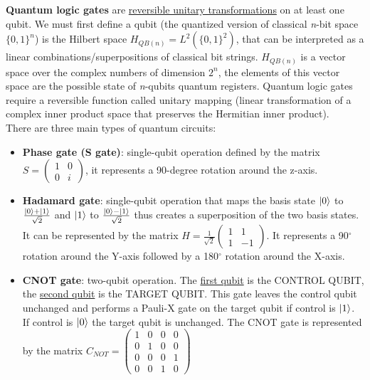 \textbf{Quantum logic gates} are \underline{reversible unitary transformations} on at least one qubit. We must first define a qubit (the quantized version of classical \textit{n}-bit space $\{0,1\}^n$) is the Hilbert space $H_{QB(n)}=L^2(\{0,1\}^2)$, that can be interpreted as a linear combinations/superpositions of classical bit strings. $H_{QB(n)}$ is a vector space over the complex numbers of dimension $2^n$, the elements of this vector space are the possible state of \textit{n}-qubits quantum registers. Quantum logic gates require a reversible function called unitary mapping (linear transformation of a complex inner product space that preserves the Hermitian inner product).\\
There are three main types of quantum circuits:
\begin{itemize}
\item \textbf{Phase gate (S gate)}: single-qubit operation defined by the matrix
$S=\begin{pmatrix}1&0\\0&i \end{pmatrix}$, it represents a 90-degree rotation around the z-axis.
\item \textbf{Hadamard gate}: single-qubit operation that maps the basis state $\ket{0}$ to $\frac{\ket{0}+\ket{1}}{\sqrt{2}}$ and $\ket{1}$ to $\frac{\ket{0}-\ket{1}}{\sqrt{2}}$ thus creates a superposition of the two basis states. It can be represented by the matrix $H=\frac{1}{\sqrt{2}}\begin{pmatrix} 1&1\\1&-1\end{pmatrix}$. It represents a 90$^{\circ}$ rotation around the Y-axis followed by a 180$^{\circ}$ rotation around the X-axis.
\item \textbf{CNOT gate}: two-qubit operation. The \underline{first qubit} is the CONTROL QUBIT, the \underline{second qubit} is the TARGET QUBIT. This gate leaves the control qubit unchanged and performs a Pauli-X gate on the target qubit if control is $\ket{1}$. If control is $\ket{0}$ the target qubit is unchanged. The CNOT gate is represented by the matrix $C_{NOT} = \begin{pmatrix}1&0&0&0\\0&1&0&0\\0&0&0&1\\0&0&1&0 \end{pmatrix}$
\end{itemize}
